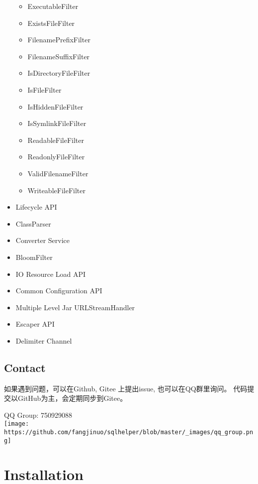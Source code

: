 \documentclass[
]{book}
\newenvironment{Shaded}{\begin{snugshade}}{\end{snugshade}}
\newcommand{\KeywordTok}[1]{\textcolor[rgb]{0.13,0.29,0.53}{\textbf{#1}}}
\newcommand{\NormalTok}[1]{#1}
\providecommand{\tightlist}{%
  \setlength{\itemsep}{0pt}\setlength{\parskip}{0pt}}
\begin{document}
\begin{itemize}
  \begin{itemize}
  \tightlist
  \item
    ExecutableFilter
  \item
    ExistsFileFilter
  \item
    FilenamePrefixFilter
  \item
    FilenameSuffixFilter
  \item
    IsDirectoryFileFilter
  \item
    IsFileFilter
  \item
    IsHiddenFileFilter
  \item
    IsSymlinkFileFilter
  \item
    ReadableFileFilter
  \item
    ReadonlyFileFilter
  \item
    ValidFilenameFilter
  \item
    WriteableFileFilter
  \end{itemize}
\item
  Lifecycle API
\item
  ClassParser
\item
  Converter Service
\item
  BloomFilter
\item
  IO Resource Load API
\item
  Common Configuration API
\item
  Multiple Level Jar URLStreamHandler
\item
  Escaper API
\item
  Delimiter Channel
\end{itemize}

\hypertarget{langx-java_contact}{%
\section{Contact}\label{langx-java_contact}}

如果遇到问题，可以在Github, Gitee 上提出issue, 也可以在QQ群里询问。
代码提交以GitHub为主，会定期同步到Gitee。

QQ Group: 750929088\\
\texttt{[image: https://github.com/fangjinuo/sqlhelper/blob/master/\_images/qq\_group.png]}

\hypertarget{langx-java_installation}{%
\chapter{Installation}\label{langx-java_installation}}

\begin{Shaded}
\end{Shaded}
\end{document}
